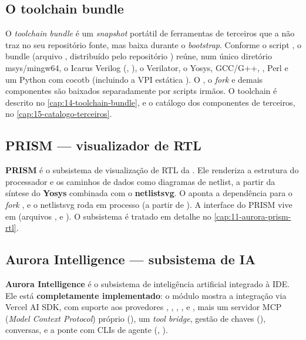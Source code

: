 \subsection{O toolchain bundle}
\label{sec:01-toolchain}

O \emph{toolchain bundle} é um \emph{snapshot} portátil de ferramentas de
terceiros que a  não traz no seu repositório fonte, mas baixa
durante o \emph{bootstrap}. Conforme o script
, o bundle (arquivo
, distribuído pelo repositório )
reúne, num único diretório msys/mingw64, o Icarus Verilog (,
), o Verilator, o Yosys, GCC/G++, , Perl e um Python com
cocotb (incluindo a VPI estática ). O
, o \emph{fork}  e demais componentes são
baixados separadamente por scripts irmãos. O toolchain é descrito no
\autoref{cap:14-toolchain-bundle}, e o catálogo dos componentes de terceiros, no
\autoref{cap:15-catalogo-terceiros}.

\subsection{PRISM --- visualizador de RTL}
\label{sec:01-prism}

\textbf{PRISM} é o subsistema de visualização de RTL da . Ele
renderiza a estrutura do processador e os caminhos de dados como diagramas de
netlist, a partir da síntese do \textbf{Yosys} combinada com o
\textbf{netlistsvg}. O  aponta a dependência
 para o \emph{fork} , e o
netlistsvg roda em processo (a partir de ). A interface do
PRISM vive em  (arquivos ,  e
). O subsistema é tratado em detalhe no
\autoref{cap:11-aurora-prism-rtl}.

\subsection{Aurora Intelligence --- subsistema de IA}
\label{sec:01-aurora-intelligence}

\textbf{Aurora Intelligence} é o subsistema de inteligência artificial integrado
à IDE. Ele está \textbf{completamente implementado}: o módulo
 mostra a integração via Vercel AI SDK, com suporte aos
provedores , , , ,
 e , mais um servidor MCP (\emph{Model Context Protocol})
próprio (), um \emph{tool bridge}, gestão de
chaves (), conversas, e a ponte com CLIs de agente
(, ).


